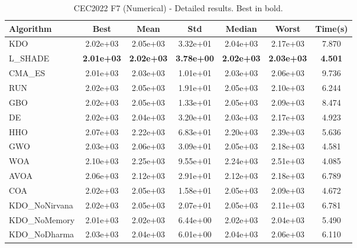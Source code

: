 \begin{table}[H]
\centering\small
\caption{CEC2022 F7 (Numerical) - Detailed results. Best in bold.}
\label{tab:cec2022_F7}
\begin{tabular}{lcccccc}
\toprule
\textbf{Algorithm} & \textbf{Best} & \textbf{Mean} & \textbf{Std} & \textbf{Median} & \textbf{Worst} & \textbf{Time(s)} \\
\midrule
KDO & 2.02e+03 & 2.05e+03 & 3.32e+01 & 2.04e+03 & 2.17e+03 & 7.870 \\
L_SHADE & \textbf{2.01e+03} & \textbf{2.02e+03} & \textbf{3.78e+00} & \textbf{2.02e+03} & \textbf{2.03e+03} & \textbf{4.501} \\
CMA_ES & 2.01e+03 & 2.03e+03 & 1.01e+01 & 2.03e+03 & 2.06e+03 & 9.736 \\
RUN & 2.02e+03 & 2.05e+03 & 1.91e+01 & 2.05e+03 & 2.10e+03 & 6.244 \\
GBO & 2.02e+03 & 2.05e+03 & 1.33e+01 & 2.05e+03 & 2.09e+03 & 8.474 \\
DE & 2.02e+03 & 2.04e+03 & 3.20e+01 & 2.03e+03 & 2.17e+03 & 4.923 \\
HHO & 2.07e+03 & 2.22e+03 & 6.83e+01 & 2.20e+03 & 2.39e+03 & 5.636 \\
GWO & 2.03e+03 & 2.06e+03 & 3.09e+01 & 2.05e+03 & 2.18e+03 & 4.581 \\
WOA & 2.10e+03 & 2.25e+03 & 9.55e+01 & 2.24e+03 & 2.51e+03 & 4.085 \\
AVOA & 2.06e+03 & 2.12e+03 & 2.91e+01 & 2.12e+03 & 2.18e+03 & 6.789 \\
COA & 2.02e+03 & 2.05e+03 & 1.58e+01 & 2.05e+03 & 2.09e+03 & 4.672 \\
KDO_NoNirvana & 2.02e+03 & 2.05e+03 & 2.07e+01 & 2.05e+03 & 2.11e+03 & 6.781 \\
KDO_NoMemory & 2.01e+03 & 2.02e+03 & 6.44e+00 & 2.02e+03 & 2.04e+03 & 5.490 \\
KDO_NoDharma & 2.03e+03 & 2.04e+03 & 6.01e+00 & 2.04e+03 & 2.06e+03 & 6.110 \\
\bottomrule
\end{tabular}
\end{table}
